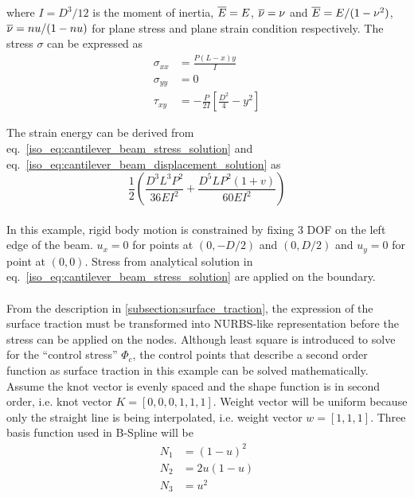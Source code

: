 where $I=D^3/12$ is the moment of inertia, $\overline{E}=E$, $\overline{\nu}=\nu$ and $\overline{E}=E/(1-\nu^2)$, $\overline{\nu}=nu/(1-nu)$ for plane
    stress and plane strain condition respectively.
The stress $\sigma$ can be expressed as \cite{Aug2008}
    \begin{subequations}
    \begin{align}
        \sigma_{xx} &= \frac{P(L-x)y}{I} \\
        \sigma_{yy} &= 0 \\
        \tau_{xy} &= -\frac{P}{2I} \left[
            \frac{D^2}{4} - y^2
        \right]
    \end{align}
    \label{iso_eq:cantilever_beam_stress_solution}
    \end{subequations}

The strain energy can be derived from eq.~\ref{iso_eq:cantilever_beam_stress_solution} and eq.~\ref{iso_eq:cantilever_beam_displacement_solution} as
    \begin{equation}
        \frac{1}{2} \left(
            \frac{D^3 L^3 P^2}{36EI^2} + 
            \frac{D^5LP^2(1+v)}{60EI^2}
        \right)
    \label{iso_eq:cantilever_beam_energy_solution}
    \end{equation}

\paragraph{}
In this example, rigid body motion is constrained by fixing 3 DOF on the left edge of the beam.
$u_x=0$ for points at $(0,-D/2)$ and $(0,D/2)$ and $u_y =0$ for point at $(0,0)$.
Stress from analytical solution in eq.~\ref{iso_eq:cantilever_beam_stress_solution} are applied on the boundary.

\paragraph{}
From the description in \ref{subsection:surface_traction}, the expression of the surface traction must be transformed into
    NURBS-like representation before the stress can be applied on the nodes.
Although least square is introduced to solve for the ``control stress'' $\Phi_c$, the control points that describe a second
    order function as surface traction in this example can be solved mathematically.
Assume the knot vector is evenly spaced and the shape function is in second order, i.e. knot vector $K=[0,0,0,1,1,1]$.
Weight vector will be uniform because only the straight line is being interpolated, i.e. weight vector $w=[1,1,1]$.
Three basis function used in B-Spline will be
    \begin{equation}
    \begin{aligned}
        N_1 & = (1-u)^2 \\
        N_2 & = 2u(1-u) \\
        N_3 & = u^2
    \end{aligned}
    \end{equation}

